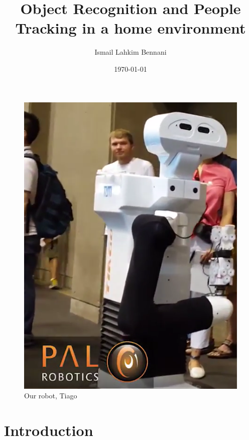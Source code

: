 \documentclass[a4paper, twocolumn]{article}
\title{Object Recognition and People Tracking in a home environment}
\author{Ismail Lahkim Bennani}
\date{\today}
\begin{document}
    \twocolumn[{\begin{@twocolumnfalse}
		\maketitle
        \tableofcontents

        \vspace{2em}
	\end{@twocolumnfalse}}]

    \begin{figure}[!b]
        \includegraphics[width=\columnwidth]{../img/tiago.png}
        \caption{Our robot, Tiago}
        \label{tiago}
    \end{figure}

    \section*{Introduction}
    
\end{document}
